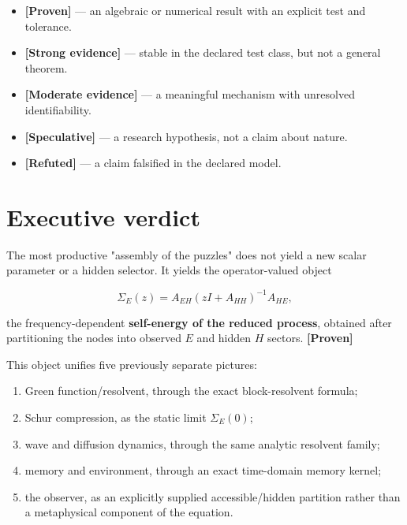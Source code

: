 \documentclass[11pt,a4paper,openany]{report}
\newcommand{\statusProven}{\textcolor{fingreen}{[Proven]}}
\newcommand{\statusStrong}{\textcolor{finblue}{[Strong evidence]}}
\newcommand{\statusModerate}{\textcolor{finviolet}{[Moderate evidence]}}
\newcommand{\statusSpeculative}{\textcolor{finorange}{[Speculative]}}
\newcommand{\statusRefuted}{\textcolor{finred}{[Refuted]}}
\begin{document}
\begin{itemize}
\item 
\textbf{\statusProven{}} --- an algebraic or numerical result with an explicit test and tolerance.

\item 
\textbf{\statusStrong{}} --- stable in the declared test class, but not a general theorem.

\item 
\textbf{\statusModerate{}} --- a meaningful mechanism with unresolved identifiability.

\item 
\textbf{\statusSpeculative{}} --- a research hypothesis, not a claim about nature.

\item 
\textbf{\statusRefuted{}} --- a claim falsified in the declared model.

\end{itemize}

\chapter{Executive verdict}

The most productive "assembly of the puzzles" does not yield a new scalar parameter or a hidden selector. It yields the operator-valued object

\[
\Sigma_E(z)=A_{EH}(zI+A_{HH})^{-1}A_{HE},
\]

the frequency-dependent \textbf{self-energy of the reduced process}, obtained after partitioning the nodes into observed \(E\) and hidden \(H\) sectors. \textbf{\statusProven{}}

This object unifies five previously separate pictures:

\begin{enumerate}
\item 
Green function/\allowbreak{}resolvent, through the exact block-resolvent formula;

\item 
Schur compression, as the static limit \(\Sigma_E(0)\);

\item 
wave and diffusion dynamics, through the same analytic resolvent family;

\item 
memory and environment, through an exact time-domain memory kernel;

\item 
the observer, as an explicitly supplied accessible/\allowbreak{}hidden partition rather than a metaphysical component of the equation.

\end{enumerate}
\end{document}
